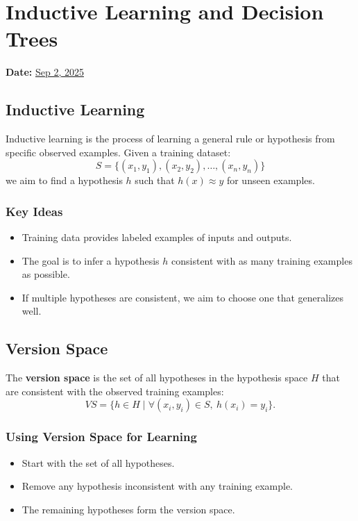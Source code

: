 \section{Inductive Learning and Decision Trees}
\textbf{Date:} \underline{Sep 2, 2025}

\subsection{Inductive Learning}

Inductive learning is the process of learning a general rule or hypothesis from specific observed examples.  
Given a training dataset:
\[
S = \{(x_1, y_1), (x_2, y_2), \dots, (x_n, y_n)\}
\]
we aim to find a hypothesis $h$ such that $h(x) \approx y$ for unseen examples.

\subsubsection*{Key Ideas}
\begin{itemize}
    \item Training data provides labeled examples of inputs and outputs.
    \item The goal is to infer a hypothesis $h$ consistent with as many training examples as possible.
    \item If multiple hypotheses are consistent, we aim to choose one that generalizes well.
\end{itemize}

\subsection{Version Space}

\begin{definition}
The \textbf{version space} is the set of all hypotheses in the hypothesis space $H$ that are consistent with the observed training examples:
\[
VS = \{ h \in H \;|\; \forall (x_i, y_i) \in S,\ h(x_i) = y_i \}.
\]
\end{definition}

\subsubsection*{Using Version Space for Learning}
\begin{itemize}
    \item Start with the set of all hypotheses.
    \item Remove any hypothesis inconsistent with any training example.
    \item The remaining hypotheses form the version space.
\end{itemize}

